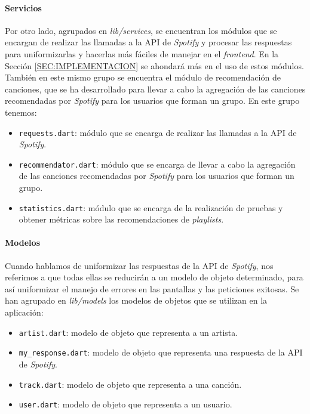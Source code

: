 \paragraph{Servicios}

Por otro lado, agrupados en \textit{lib/services}, se encuentran los módulos que se encargan de realizar las llamadas a la API de \textit{Spotify} y procesar las respuestas para uniformizarlas
y hacerlas más fáciles de manejar en el \textit{frontend}. En la Sección \ref{SEC:IMPLEMENTACION} se ahondará más en el uso de estos módulos. También en este mismo grupo se encuentra el módulo
de recomendación de canciones, que se ha desarrollado para llevar a cabo la agregación de las canciones recomendadas por \textit{Spotify} para los usuarios que forman un grupo. 
En este grupo tenemos:

\begin{itemize}
  \item \texttt{requests.dart}: módulo que se encarga de realizar las llamadas a la API de \textit{Spotify}.
  \item \texttt{recommendator.dart}: módulo que se encarga de llevar a cabo la agregación de las canciones recomendadas por \textit{Spotify} para los usuarios que forman un grupo.
  \item \texttt{statistics.dart}: módulo que se encarga de la realización de pruebas y obtener métricas sobre las recomendaciones de \textit{playlists}.
\end{itemize}

\paragraph{Modelos}

Cuando hablamos de uniformizar las respuestas de la API de \textit{Spotify}, nos referimos a que todas ellas se reducirán a un modelo de objeto determinado, para así uniformizar el manejo de
errores en las pantallas y las peticiones exitosas. Se han agrupado en \textit{lib/models} los modelos de objetos que se utilizan en la aplicación:

\begin{itemize}
  \item \texttt{artist.dart}: modelo de objeto que representa a un artista.
  \item \texttt{my\_response.dart}: modelo de objeto que representa una respuesta de la API de \textit{Spotify}.
  \item \texttt{track.dart}: modelo de objeto que representa a una canción.
  \item \texttt{user.dart}: modelo de objeto que representa a un usuario.
\end{itemize}



